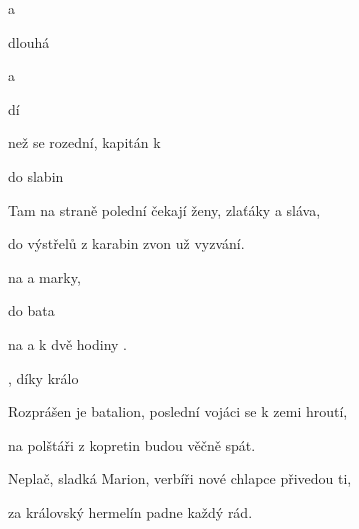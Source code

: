 

 a 

dlouhá  

  a  

 dí 

\zs
{} než se rozední,
kapitán k   

 do slabin  

Tam na straně polední
čekají ženy, zlaťáky a sláva,

do výstřelů z karabin zvon už vyzvání.
\ks

\zr
{} na  a  marky,

 do  bata 

 na  a k  dvě hodiny .

, díky  králo 
\kr

\zs
Rozprášen je batalion,
poslední vojáci se k zemi hroutí,

na polštáři z kopretin budou věčně spát.

Neplač, sladká Marion,
verbíři nové chlapce přivedou ti,

za královský hermelín padne každý rád.
\ks

\zr  \kr

\kp






